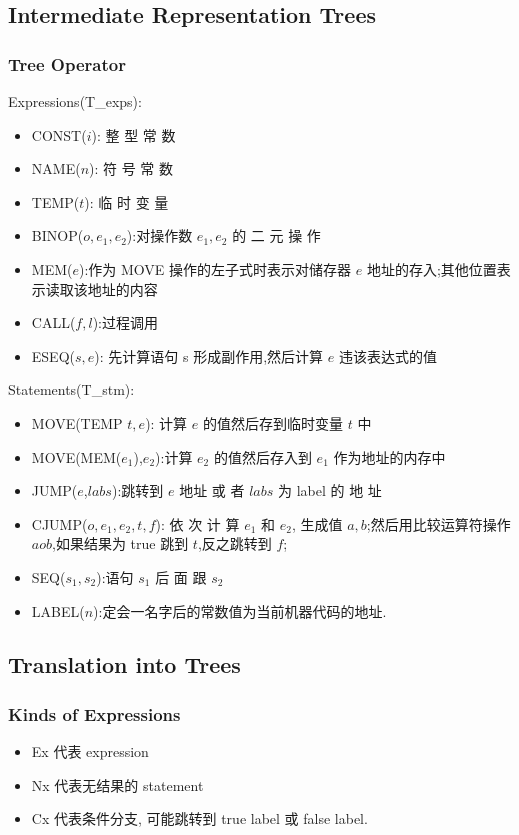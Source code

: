 \subsection{Intermediate Representation Trees}
\subsubsection{Tree Operator}
Expressions(T\_exps): 
\begin{itemize}
    \item CONST($i$): 整 型 常 数 
    \item NAME($n$): 符 号 常 数 
    \item TEMP($t$): 临 时 变 量 
    \item BINOP($o, e_1, e_2$):对操作数 $e_1,e_2$ 的 二 元 操 作 
    \item MEM($e$):作为 MOVE 操作的左子式时表示对储存器 $e$ 地址的存入;其他位置表示读取该地址的内容 
    \item CALL($f,l$):过程调用 
    \item ESEQ($s,e$): 先计算语句 s 形成副作用,然后计算 $e$ 违该表达式的值 
\end{itemize}

Statements(T\_stm):
\begin{itemize}
    \item MOVE(TEMP $t, e$): 计算 $e$ 的值然后存到临时变量 $t$ 中
    \item MOVE(MEM($e_1$),$e_2$):计算 $e_2$ 的值然后存入到 $e_1$ 作为地址的内存中 
    \item JUMP($e$,$labs$):跳转到 $e$ 地址 或 者 $labs$ 为 label 的 地 址
    \item CJUMP($o,e_1,e_2,t,f$): 依 次 计 算 $e_1$ 和 $e_2$, 生成值 $a,b$;然后用比较运算符操作 $aob$,如果结果为 true 跳到 $t$,反之跳转到 $f$; 
    \item SEQ($s_1,s_2$):语句 $s_1$ 后 面 跟 $s_2$
    \item LABEL($n$):定会一名字后的常数值为当前机器代码的地址.
\end{itemize}


\subsection{Translation into Trees}
\subsubsection{Kinds of Expressions}
\begin{itemize}
    \item Ex 代表 expression
    \item Nx 代表无结果的 statement
    \item Cx 代表条件分支, 可能跳转到 true label 或 false label.
\end{itemize}

